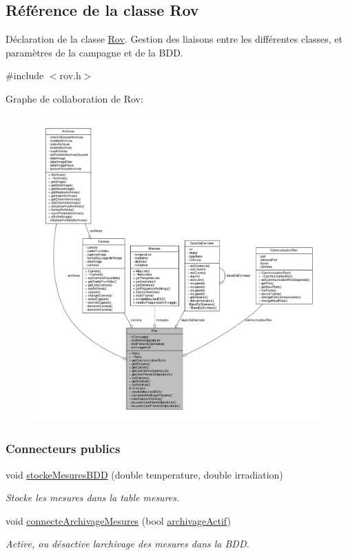 \hypertarget{class_rov}{}\subsection{Référence de la classe Rov}
\label{class_rov}


Déclaration de la classe \hyperlink{class_rov}{Rov}. Gestion des liaisons entre les différentes classes, et paramètres de la campagne et de la B\+DD.  




{\ttfamily \#include $<$rov.\+h$>$}



Graphe de collaboration de Rov\+:
\nopagebreak
\begin{figure}[H]
\begin{center}
\leavevmode
\includegraphics[width=350pt]{class_rov__coll__graph}
\end{center}
\end{figure}
\subsubsection*{Connecteurs publics}
\begin{DoxyCompactItemize}
\item 
void \hyperlink{class_rov_adab08abfde381c2915695489b34da6b4}{stocke\+Mesures\+B\+DD} (double temperature, double irradiation)
\begin{DoxyCompactList}\small\item\em Stocke les mesures dans la table mesures. \end{DoxyCompactList}\item 
void \hyperlink{class_rov_a738965ca84678b506b3d6a326c48e9e3}{connecte\+Archivage\+Mesures} (bool \hyperlink{class_rov_a659da5fe3636356b006a8e08a8433dd3}{archivage\+Actif})
\begin{DoxyCompactList}\small\item\em Active, ou désactive l\textquotesingle{}archivage des mesures dans la B\+DD. \end{DoxyCompactList}\end{DoxyCompactItemize}
